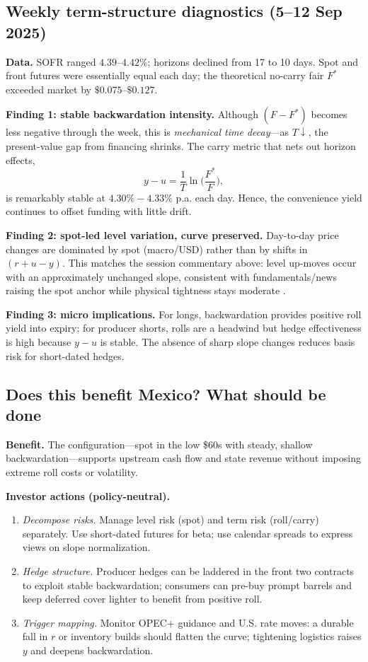 \documentclass[11pt,a4paper]{article} %
\begin{document}
\subsection{Weekly term-structure diagnostics (5–12 Sep 2025)}
\textbf{Data.} SOFR ranged \(4.39\)–\(4.42\%\); horizons declined from 17 to 10 days. Spot and front futures were essentially equal each day; the theoretical no-carry fair \(F^{*}\) exceeded market by \(\$0.075\)–\(\$0.127\).

\textbf{Finding 1: stable backwardation intensity.} Although \((F-F^{*})\) becomes less negative through the week, this is \emph{mechanical time decay}—as \(T\downarrow\), the present-value gap from financing shrinks. The carry metric that nets out horizon effects,
\[
y-u=\frac{1}{T}\ln\!\Big(\frac{F^{*}}{F}\Big),
\]
is remarkably stable at \(\mathbf{4.30\%{-}4.33\%}\) p.a. each day. Hence, the convenience yield continues to offset funding with little drift.

\textbf{Finding 2: spot-led level variation, curve preserved.} Day-to-day price changes are dominated by spot (macro/USD) rather than by shifts in \((r+u-y)\). This matches the session commentary above: level up-moves occur with an approximately unchanged slope, consistent with fundamentals/news raising the spot anchor while physical tightness stays moderate \citep{eia_prices_2023,eia_opec_2024,bis_usd_commodity_2023}.

\textbf{Finding 3: micro implications.} For longs, backwardation provides positive roll yield into expiry; for producer shorts, rolls are a headwind but hedge effectiveness is high because \(y-u\) is stable. The absence of sharp slope changes reduces basis risk for short-dated hedges.

\subsection{Does this benefit Mexico? What should be done}
\textbf{Benefit.} The configuration—spot in the low \$60s with steady, shallow backwardation—supports upstream cash flow and state revenue without imposing extreme roll costs or volatility.

\textbf{Investor actions (policy-neutral).}
\begin{enumerate}
  \item \emph{Decompose risks.} Manage level risk (spot) and term risk (roll/carry) separately. Use short-dated futures for beta; use calendar spreads to express views on slope normalization.
  \item \emph{Hedge structure.} Producer hedges can be laddered in the front two contracts to exploit stable backwardation; consumers can pre-buy prompt barrels and keep deferred cover lighter to benefit from positive roll.
  \item \emph{Trigger mapping.} Monitor OPEC+ guidance and U.S. rate moves: a durable fall in \(r\) or inventory builds should flatten the curve; tightening logistics raises \(y\) and deepens backwardation.
\end{enumerate}
\end{document}
